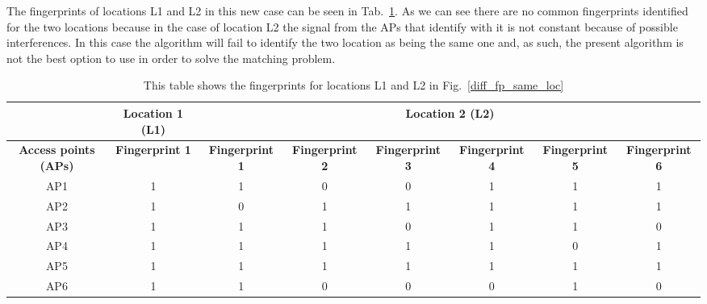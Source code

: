 The fingerprints of locations L1 and L2 in this new case can be seen in
Tab.~\ref{tab:table_fingerprints_same_loc}. As we can see there are no common
fingerprints identified for the two locations because in the case of location L2
the signal from the APs that identify with it is not constant because of
possible interferences. In this case the algorithm will fail to identify the two
location as being the same one and, as such, the present algorithm is not the
best option to use in order to solve the matching problem.

\begin{table}[h]
\begin{tabularx}{0.75\textwidth}{|c|c|c|c|c|c|c|c|}
\hline
                             & \textbf{Location 1 (L1)} & \multicolumn{6}{c|}{\textbf{Location 2 (L2)}}                                                                                                       \\ \hline
\textbf{Access points (APs)} & \textbf{Fingerprint 1}   & \textbf{Fingerprint 1} & \textbf{Fingerprint 2} & \textbf{Fingerprint 3} & \textbf{Fingerprint 4} & \textbf{Fingerprint 5} & \textbf{Fingerprint 6} \\ \hline
AP1                          & 1                        & 1                      & 0                      & 0                      & 1                      & 1                      & 1                      \\
AP2                          & 1                        & 0                      & 1                      & 1                      & 1                      & 1                      & 1                      \\
AP3                          & 1                        & 1                      & 1                      & 0                      & 1                      & 1                      & 0                      \\
AP4                          & 1                        & 1                      & 1                      & 1                      & 1                      & 0                      & 1                      \\
AP5                          & 1                        & 1                      & 1                      & 1                      & 1                      & 1                      & 1                      \\
AP6                          & 1                        & 1                      & 0                      & 0                      & 0                      & 1                      & 0                      \\ \hline
\end{tabularx}
\caption{This table shows the fingerprints for locations L1 and L2 in
Fig.~\ref{diff_fp_same_loc}}
\label{tab:table_fingerprints_same_loc}
\end{table}

